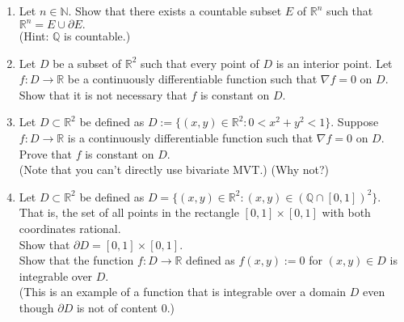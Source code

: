 \documentclass{article}
\begin{document}
\begin{enumerate}
	\item Let $n \in \mathbb{N}.$ Show that there exists a countable subset $E$ of $\mathbb{R}^n$ such that $\mathbb{R}^n = E \cup \partial E.$\\
	(Hint: $\mathbb{Q}$ is countable.)
	\item Let $D$ be a subset of $\mathbb{R}^2$ such that every point of $D$ is an interior point. Let $f : D \to \mathbb{R}$ be a continuously differentiable function such that $\nabla f = 0$ on $D.$\\
	Show that it is not necessary that $f$ is constant on $D.$
	\item Let $D \subset \mathbb{R}^2$ be defined as $D := \{(x, y)\in\mathbb{R}^2 : 0 < x^2 + y^2 < 1\}.$ Suppose $f:D \to \mathbb{R}$ is a continuously differentiable function such that $\nabla f = 0$ on $D.$\\
	Prove that $f$ is constant on $D.$ \\
	(Note that you can't directly use bivariate MVT.) \hfill (Why not?)
	\item Let $D \subset \mathbb{R}^2$ be defined as $D = \{(x, y) \in \mathbb{R}^2 : (x, y) \in (\mathbb{Q} \cap [0, 1])^2\}.$ That is, the set of all points in the rectangle $[0,1]\times[0,1]$ with both coordinates rational.\\
	Show that $\partial D = [0, 1]\times[0, 1].$\\
	Show that the function $f:D \to \mathbb{R}$ defined as $f(x, y) := 0$ for $(x, y) \in D$ is integrable over $D.$\\
	(This is an example of a function that is integrable over a domain $D$ even though $\partial D$ is not of content $0.$)
\end{enumerate}
\end{document}
